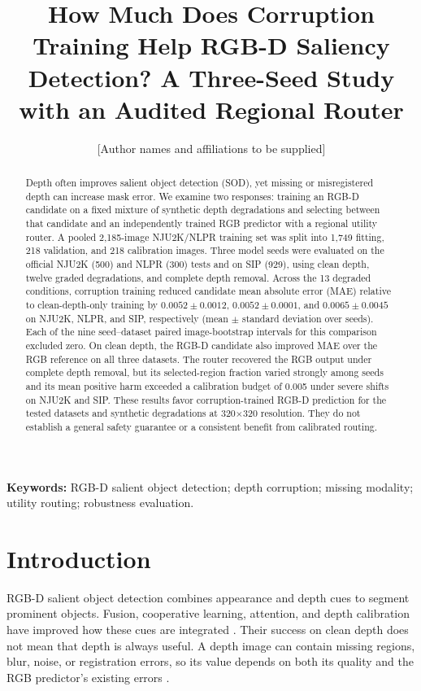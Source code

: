 \documentclass[11pt]{article}
\title{How Much Does Corruption Training Help RGB-D Saliency Detection? A Three-Seed Study with an Audited Regional Router}
\author{[Author names and affiliations to be supplied]}
\date{}
\begin{document}
\maketitle

\begin{abstract}
Depth often improves salient object detection (SOD), yet missing or misregistered depth can increase mask error. We examine two responses: training an RGB-D candidate on a fixed mixture of synthetic depth degradations and selecting between that candidate and an independently trained RGB predictor with a regional utility router. A pooled 2,185-image NJU2K/NLPR training set was split into 1,749 fitting, 218 validation, and 218 calibration images. Three model seeds were evaluated on the official NJU2K (500) and NLPR (300) tests and on SIP (929), using clean depth, twelve graded degradations, and complete depth removal. Across the 13 degraded conditions, corruption training reduced candidate mean absolute error (MAE) relative to clean-depth-only training by $0.0052\pm0.0012$, $0.0052\pm0.0001$, and $0.0065\pm0.0045$ on NJU2K, NLPR, and SIP, respectively (mean $\pm$ standard deviation over seeds). Each of the nine seed--dataset paired image-bootstrap intervals for this comparison excluded zero. On clean depth, the RGB-D candidate also improved MAE over the RGB reference on all three datasets. The router recovered the RGB output under complete depth removal, but its selected-region fraction varied strongly among seeds and its mean positive harm exceeded a calibration budget of 0.005 under severe shifts on NJU2K and SIP. These results favor corruption-trained RGB-D prediction for the tested datasets and synthetic degradations at 320$\times$320 resolution. They do not establish a general safety guarantee or a consistent benefit from calibrated routing.
\end{abstract}
\noindent\textbf{Keywords:} RGB-D salient object detection; depth corruption; missing modality; utility routing; robustness evaluation.

\section{Introduction}
RGB-D salient object detection combines appearance and depth cues to segment prominent objects. Fusion, cooperative learning, attention, and depth calibration have improved how these cues are integrated \cite{pcf,dmra,jldcf,bbsnet,dcf}. Their success on clean depth does not mean that depth is always useful. A depth image can contain missing regions, blur, noise, or registration errors, so its value depends on both its quality and the RGB predictor's existing errors \cite{dqas,dqfm,dsn}.
\end{document}
